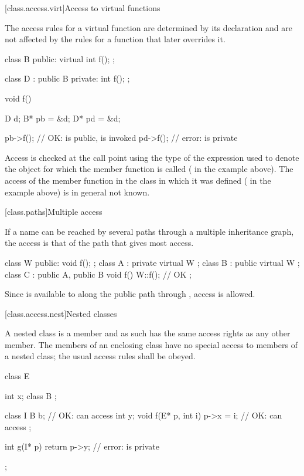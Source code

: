 [class.access.virt]{Access to virtual functions}%

\pnum
The access rules for a virtual function are determined by its declaration
and are not affected by the rules for a function that later overrides it.
\begin{example}
\begin{codeblock}
class B {
public:
  virtual int f();
};

class D : public B {
private:
  int f();
};

void f() {
  D d;
  B* pb = &d;
  D* pd = &d;

  pb->f();                      // OK:  is public,  is invoked
  pd->f();                      // error:  is private
}
\end{codeblock}
\end{example}

\pnum
Access is checked at the call point using the type of the expression used
to denote the object for which the member function is called
(
in the example above).
The access of the member function in the class in which it was defined
(
in the example above) is in general not known.

[class.paths]{Multiple access}%

\pnum
If a name can be reached by several paths through a multiple inheritance
graph, the access is that of the path that gives most access.
\begin{example}
\begin{codeblock}
class W { public: void f(); };
class A : private virtual W { };
class B : public virtual W { };
class C : public A, public B {
  void f() { W::f(); }          // OK
};
\end{codeblock}

Since
is available to
along the public path through
,
access is allowed.
\end{example}

[class.access.nest]{Nested classes}%
%

\pnum
A nested class is a member and as such has the same access rights as any other member.
The members of an enclosing class have no special access to members of a nested
class; the usual access rules shall be obeyed.
\begin{example}
\begin{codeblock}
class E {
  int x;
  class B { };

  class I {
    B b;                        // OK:  can access 
    int y;
    void f(E* p, int i) {
      p->x = i;                 // OK:  can access 
    }
  };

  int g(I* p) {
    return p->y;                // error:  is private
  }
};
\end{codeblock}
\end{example}

